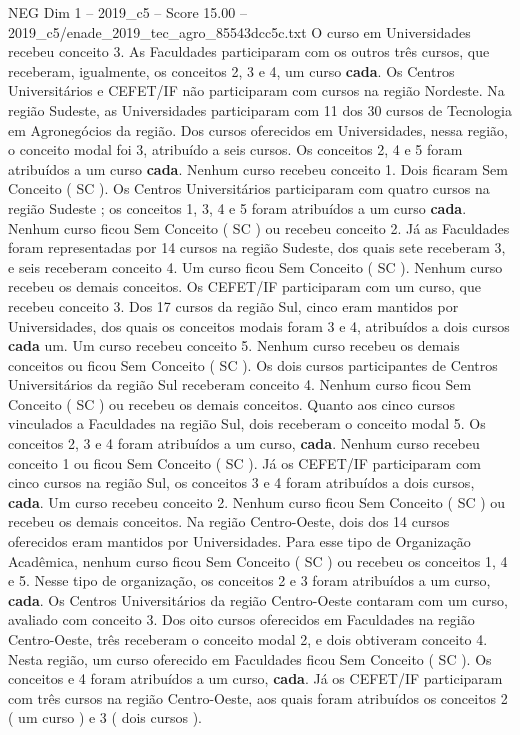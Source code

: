 \begin{textsample}{NEG Dim 1 – 2019\_c5 – Score 15.00 – 2019\_c5/enade\_2019\_tec\_agro\_85543dcc5c.txt}
O curso em Universidades recebeu conceito 3.
As Faculdades participaram com os outros três cursos, que receberam, igualmente, os conceitos 2, 3 e 4, um curso \textbf{cada}.
Os Centros Universitários e CEFET/IF não participaram com cursos na região Nordeste.
Na região Sudeste, as Universidades participaram com 11 dos 30 cursos de Tecnologia em Agronegócios da região.
Dos cursos oferecidos em Universidades, nessa região, o conceito modal foi 3, atribuído a seis cursos.
Os conceitos 2, 4 e 5 foram atribuídos a um curso \textbf{cada}.
Nenhum curso recebeu conceito 1.
Dois ficaram Sem Conceito ( SC ).
Os Centros Universitários participaram com quatro cursos na região Sudeste ; os conceitos 1, 3, 4 e 5 foram atribuídos a um curso \textbf{cada}.
Nenhum curso ficou Sem Conceito ( SC ) ou recebeu conceito 2.
Já as Faculdades foram representadas por 14 cursos na região Sudeste, dos quais sete receberam 3, e seis receberam conceito 4.
Um curso ficou Sem Conceito ( SC ).
Nenhum curso recebeu os demais conceitos.
Os CEFET/IF participaram com um curso, que recebeu conceito 3.
Dos 17 cursos da região Sul, cinco eram mantidos por Universidades, dos quais os conceitos modais foram 3 e 4, atribuídos a dois cursos \textbf{cada} um.
Um curso recebeu conceito 5.
Nenhum curso recebeu os demais conceitos ou ficou Sem Conceito ( SC ).
Os dois cursos participantes de Centros Universitários da região Sul receberam conceito 4.
Nenhum curso ficou Sem Conceito ( SC ) ou recebeu os demais conceitos.
Quanto aos cinco cursos vinculados a Faculdades na região Sul, dois receberam o conceito modal 5.
Os conceitos 2, 3 e 4 foram atribuídos a um curso, \textbf{cada}.
Nenhum curso recebeu conceito 1 ou ficou Sem Conceito ( SC ).
Já os CEFET/IF participaram com cinco cursos na região Sul, os conceitos 3 e 4 foram atribuídos a dois cursos, \textbf{cada}.
Um curso recebeu conceito 2.
Nenhum curso ficou Sem Conceito ( SC ) ou recebeu os demais conceitos.
Na região Centro-Oeste, dois dos 14 cursos oferecidos eram mantidos por Universidades.
Para esse tipo de Organização Acadêmica, nenhum curso ficou Sem Conceito ( SC ) ou recebeu os conceitos 1, 4 e 5.
Nesse tipo de organização, os conceitos 2 e 3 foram atribuídos a um curso, \textbf{cada}.
Os Centros Universitários da região Centro-Oeste contaram com um curso, avaliado com conceito 3.
Dos oito cursos oferecidos em Faculdades na região Centro-Oeste, três receberam o conceito modal 2, e dois obtiveram conceito 4.
Nesta região, um curso oferecido em Faculdades ficou Sem Conceito ( SC ).
Os conceitos e 4 foram atribuídos a um curso, \textbf{cada}.
Já os CEFET/IF participaram com três cursos na região Centro-Oeste, aos quais foram atribuídos os conceitos 2 ( um curso ) e 3 ( dois cursos ).

\end{textsample}
